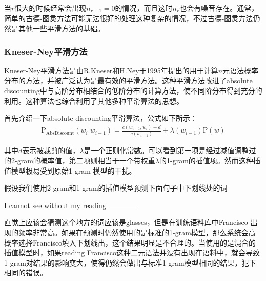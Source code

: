 \vspace{-1.5em}
\parinterval 当$r$很大的时候经常会出现$n_{r+1}=0$的情况，而且这时$n_r$也会有噪音存在。通常，简单的古德-图灵方法可能无法很好的处理这种复杂的情况，不过古德-图灵方法仍然是其他一些平滑方法的基础。


\subsubsection{Kneser-Ney平滑方法}

\parinterval Kneser-Ney平滑方法是由R.Kneser和H.Ney于1995年提出的用于计算$n$元语法概率分布的方法\cite{kneser1995improved}\cite{chen1999empirical}，并被广泛认为是最有效的平滑方法。这种平滑方法改进了absolute discounting中与高阶分布相结合的低阶分布的计算方法，使不同阶分布得到充分的利用。这种算法也综合利用了其他多种平滑算法的思想。

\parinterval 首先介绍一下absolute discounting平滑算法，公式如下所示：
\begin{eqnarray}
\textrm{P}_{\textrm{AbsDiscount}}(w_i | w_{i-1}) = \frac{c(w_{i-1},w_i )-d}{c(w_{i-1})} + \lambda(w_{i-1})\textrm{P}(w)
\label{eq:2-33}
\end{eqnarray}

\noindent 其中$d$表示被裁剪的值，$\lambda$是一个正则化常数。可以看到第一项是经过减值调整过的2-gram的概率值，第二项则相当于一个带权重$\lambda$的1-gram的插值项。然而这种插值模型极易受到原始1-gram 模型的干扰。

\parinterval 假设我们使用2-gram和1-gram的插值模型预测下面句子中下划线处的词

\vspace{0.0em}
\begin{center}
I cannot see without my reading \underline{\ \ \ \ \ \ \ \ }
\end{center}
\vspace{0.0em}

\noindent 直觉上应该会猜测这个地方的词应该是glasses，但是在训练语料库中Francisco 出现的频率非常高。如果在预测时仍然使用的是标准的1-gram模型，那么系统会高概率选择Francisco填入下划线出，这个结果明显是不合理的。当使用的是混合的插值模型时，如果reading Francisco这种二元语法并没有出现在语料中，就会导致1-gram对结果的影响变大，使得仍然会做出与标准1-gram模型相同的结果，犯下相同的错误。

